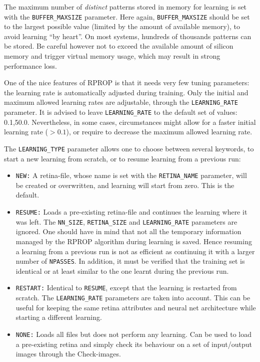 \documentclass[11pt,titlepage]{article}
\begin{document}
The maximum
number of {\em distinct} patterns stored in memory for learning is set with the {\tt BUFFER\_MAXSIZE} parameter. Here
again, {\tt BUFFER\_MAXSIZE} should be set to the largest possible value (limited by the amount of available
memory), to avoid learning ``by heart''. On most systems, hundreds of thousands patterns can be stored. Be careful
however not to exceed the available amount of silicon memory and trigger virtual memory usage, which may result
in strong performance loss.

One of the nice features of RPROP is that it needs very few tuning parameters: the learning rate is automatically
adjusted during training. Only the initial and maximum allowed learning rates are adjustable, through the
{\tt LEARNING\_RATE} parameter. It is advised to leave {\tt LEARNING\_RATE} to the default set of values: 0.1,50.0.
Nevertheless, in some cases, circumstances might allow for a faster initial learning rate ($>0.1$), or require to
decrease the maximum allowed learning rate.

The {\tt LEARNING\_TYPE} parameter allows one to choose between several keywords, to start a new learning from
scratch, or to resume learning from a previous run:
\begin{itemize}
\item{\tt NEW:} A retina-file, whose name is set with the {\tt RETINA\_NAME} parameter, will be created
or overwritten, and learning will start from zero. This is the default.
\item{\tt RESUME:} Loads a pre-existing retina-file and continues the learning where it was left.
The  {\tt NN\_SIZE}, {\tt RETINA\_SIZE} and {\tt LEARNING\_RATE} parameters are ignored. One should
have in mind that not all the temporary information managed by the RPROP algorithm during learning is
saved. Hence resuming a learning from a previous run is not as efficient as continuing it with a larger
number of {\tt NPASSES}. In addition, it must be verified that the training set is identical or at least
similar to the one learnt during the previous run.
\item{\tt RESTART:} Identical to {\tt RESUME}, except that the learning is restarted from scratch.
The {\tt LEARNING\_RATE} parameters are taken into account. This can be useful for keeping the same retina
attributes and neural net architecture while starting a different learning.
\item{\tt NONE:} Loads all files but does not perform any learning. Can be used to load a pre-existing
retina and simply check its behaviour on a set of input/output images through the Check-images.
\end{itemize}
\end{document}
